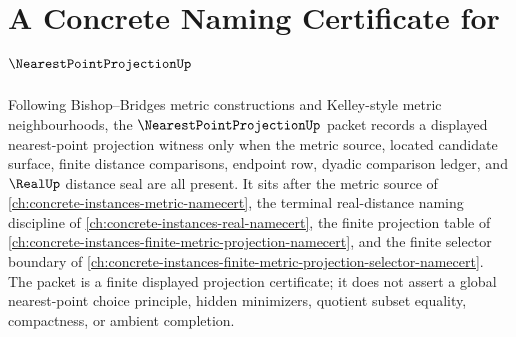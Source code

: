\chapter{A Concrete Naming Certificate for $\NearestPointProjectionUp$}
\label{ch:concrete-instances-nearest-point-projection-namecert}

Following Bishop--Bridges metric constructions and Kelley-style metric neighbourhoods, the $\NearestPointProjectionUp$ packet records a displayed nearest-point projection witness only when the metric source, located candidate surface, finite distance comparisons, endpoint row, dyadic comparison ledger, and $\RealUp$ distance seal are all present. It sits after the metric source of \autoref{ch:concrete-instances-metric-namecert}, the terminal real-distance naming discipline of \autoref{ch:concrete-instances-real-namecert}, the finite projection table of \autoref{ch:concrete-instances-finite-metric-projection-namecert}, and the finite selector boundary of \autoref{ch:concrete-instances-finite-metric-projection-selector-namecert}. The packet is a finite displayed projection certificate; it does not assert a global nearest-point choice principle, hidden minimizers, quotient subset equality, compactness, or ambient completion.

